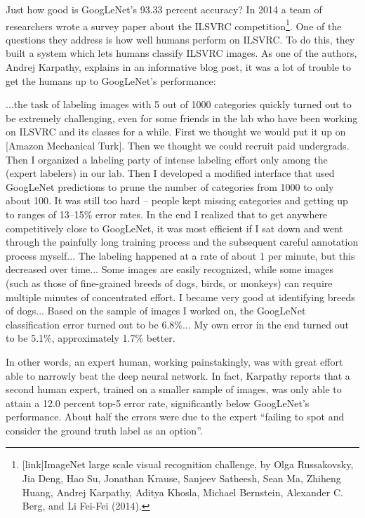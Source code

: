 \documentclass[a4paper,twoside,10pt]{book}
\begin{document}
Just how good is GoogLeNet's 93.33 percent accuracy? In 2014 a team of researchers wrote a survey paper about the ILSVRC competition\footnote{[link]ImageNet large scale visual recognition challenge, by Olga Russakovsky, Jia Deng, Hao Su, Jonathan Krause, Sanjeev Satheesh, Sean Ma, Zhiheng Huang, Andrej Karpathy, Aditya Khosla, Michael Bernstein, Alexander C. Berg, and Li Fei-Fei (2014).}. One of the questions they address is how well humans perform on ILSVRC. To do this, they built a system which lets humans classify ILSVRC images. As one of the authors, Andrej Karpathy, explains in an informative blog post, it was a lot of trouble to get the humans up to GoogLeNet's performance:
\begin{adjustwidth}{1.5cm}{0.5cm}
...the task of labeling images with 5 out of 1000 categories quickly turned out to be extremely challenging, even for some friends in the lab who have been working on ILSVRC and its classes for a while. First we thought we would put it up on [Amazon Mechanical Turk]. Then we thought we could recruit paid undergrads. Then I organized a labeling party of intense labeling effort only among the (expert labelers) in our lab. Then I developed a modified interface that used GoogLeNet predictions to prune the number of categories from 1000 to only about 100. It was still too hard -- people kept missing categories and getting up to ranges of 13--15\% error rates. In the end I realized that to get anywhere competitively close to GoogLeNet, it was most efficient if I sat down and went through the painfully long training process and the subsequent careful annotation process myself... The labeling happened at a rate of about 1 per minute, but this decreased over time... Some images are easily recognized, while some images (such as those of fine-grained breeds of dogs, birds, or monkeys) can require multiple minutes of concentrated effort. I became very good at identifying breeds of dogs... Based on the sample of images I worked on, the GoogLeNet classification error turned out to be 6.8\%... My own error in the end turned out to be 5.1\%, approximately 1.7\% better.
\end{adjustwidth}
In other words, an expert human, working painstakingly, was with great effort able to narrowly beat the deep neural network. In fact, Karpathy reports that a second human expert, trained on a smaller sample of images, was only able to attain a 12.0 percent top-5 error rate, significantly below GoogLeNet's performance. About half the errors were due to the expert ``failing to spot and consider the ground truth label as an option''.
\end{document}
